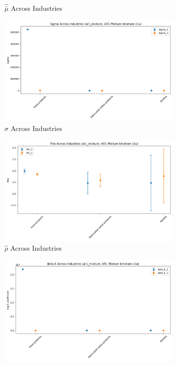 \documentclass{article}
\begin{document}
\begin{figure}[ht!]
\begin{subfigure}[t]{0.32\textwidth}
        \caption{$\hat{\bar\mu}$ Across Industries}
    \end{subfigure}
    \begin{subfigure}[t]{0.32\textwidth}
        \centering
        \includegraphics[width=\textwidth]{figure/ar1_mixture_kmshare_ciiu_sigma_across_industries.png}
        \caption{$\hat\sigma$ Across Industries}
    \end{subfigure}
    \begin{subfigure}[t]{0.32\textwidth}
        \centering
        \includegraphics[width=\textwidth]{figure/ar1_mixture_kmshare_ciiu_rho_across_industries.png}
        \caption{$\hat\rho$ Across Industries}
    \end{subfigure}
    \begin{subfigure}[t]{0.32\textwidth}
        \centering
        \includegraphics[width=\textwidth]{figure/ar1_mixture_kmshare_ciiu_beta_k_across_industries.png}

\end{subfigure}
\end{figure}
\end{document}
